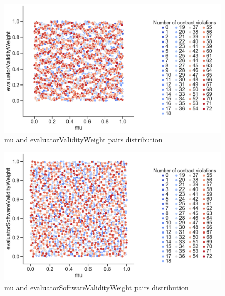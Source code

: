 \begin{figure}
	\centering
	\includegraphics[width=\textwidth]{images/PairsDistr/mu_evaluatorValidityWeight.pdf}
	\caption[mu and evaluatorValidityWeight pairs distribution]{mu and evaluatorValidityWeight pairs distribution}
	\label{fig:mu_evaluatorValidityWeight_pair}
\end{figure}
\clearpage
\begin{figure}
	\centering
	\includegraphics[width=\textwidth]{images/PairsDistr/mu_evaluatorSoftwareValidityWeight.pdf}
	\caption[mu and evaluatorSoftwareValidityWeight pairs distribution]{mu and evaluatorSoftwareValidityWeight pairs distribution}
	\label{fig:mu_evaluatorSoftwareValidityWeight_pair}
\end{figure}
\clearpage
